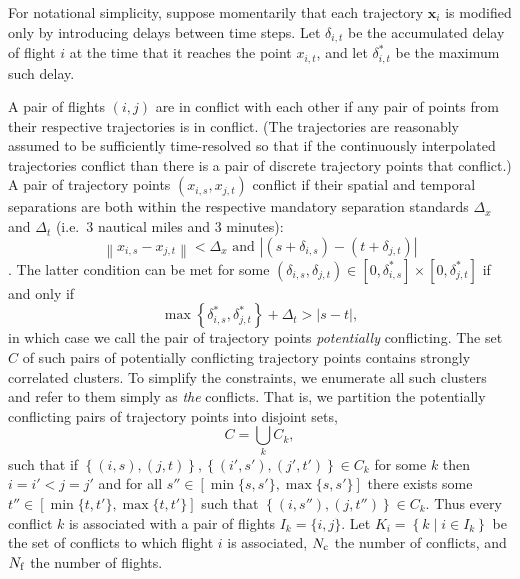 For notational simplicity, suppose momentarily that each trajectory $\mathbf x_i$ is modified only by introducing delays between time steps.
Let $\delta_{i, t}$ be the accumulated delay of flight $i$ at the time that it reaches the point $x_{i, t}$, and let $\delta^*_{i, t}$ be the maximum such delay.

A pair of flights $(i, j)$ are in conflict with each other if any pair of points from their respective trajectories is in conflict.
(The trajectories are reasonably assumed to be sufficiently time-resolved so that if the continuously interpolated trajectories conflict than there is a pair of discrete trajectory points that conflict.)
A pair of trajectory points $(x_{i,s}, x_{j,t})$ conflict if their spatial and temporal separations are both within the respective mandatory separation standards $\Delta_x$ and $\Delta_t$ (i.e.\ $3$ nautical miles and $3$ minutes):
\begin{equation}
\left\|x_{i, s} - x_{j,t}\right\| < \Delta_x \text{ and } 
\left|\left(s + \delta_{i, s}\right) - \left(t + \delta_{j,t}\right)\right|
\end{equation}.
The latter condition can be met for some 
$\left(\delta_{i,s}, \delta_{j,t} \right) \in [0, \delta^*_{i,s}] \times [0, \delta^*_{j,t}]$ if and only if 
\begin{equation}
\max \left\{\delta^*_{i, s}, \delta^*_{j, t}\right\} + \Delta_t > |s - t|,
\end{equation}
in which case we call the pair of trajectory points \emph{potentially} conflicting.
The set $C$ of such pairs of potentially conflicting trajectory points contains strongly correlated clusters.
To simplify the constraints, we enumerate all such clusters and refer to them simply as \emph{the} conflicts.
That is, we partition the potentially conflicting pairs of trajectory points into disjoint sets,
\begin{equation}
C =  \bigcup_{k} C_k,
\end{equation}
such that if $\left\{(i, s), (j, t)\right\}, \left\{(i', s'), (j', t')\right\} \in C_k$ for some $k$ then
$i = i' < j = j'$ and for all 
$s'' \in [\min \{s, s'\}, \max\{s, s'\}]$
there exists some 
${t'' \in [\min \{t, t'\}, \max\{t, t'\}]}$
such that
${\left\{(i, s''), (j, t'')\right\} \in C_k}$.
Thus every conflict $k$ is associated with a pair of flights $I_k = \{i, j\}$.
Let $K_i = \left\{k \middle| i \in I_k \right\}$ be the set of conflicts to which flight $i$ is associated, $N_{\mathrm{c}}$ the number of conflicts, and $N_{\mathrm{f}}$ the number of flights.

